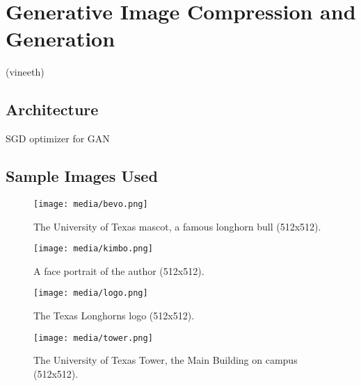 \section{Generative Image Compression and Generation}

(vineeth)

\subsection{Architecture}

SGD optimizer for GAN

\subsection{Sample Images Used}

\begin{figure}[H]
	\begin{center}
	\texttt{[image: media/bevo.png]}
	\end{center}
	\caption[Input Image 1: Bevo]{The University of Texas mascot, a famous longhorn bull (512x512).}
	\end{figure}

\begin{figure}[H]
    \begin{center}
    \texttt{[image: media/kimbo.png]}
    \end{center}
    \caption[Input Image 2: Kliment]{A face portrait of the author (512x512).}
    \end{figure}

\begin{figure}[H]
    \begin{center}
    \texttt{[image: media/logo.png]}
    \end{center}
    \caption[Input Image 3: UT Logo]{The Texas Longhorns logo (512x512).}
    \end{figure}

\begin{figure}[H]
        \begin{center}
        \texttt{[image: media/tower.png]}
        \end{center}
        \caption[Input Image 4: UT Tower]{The University of Texas Tower, the Main Building on campus (512x512).}
        \end{figure}



